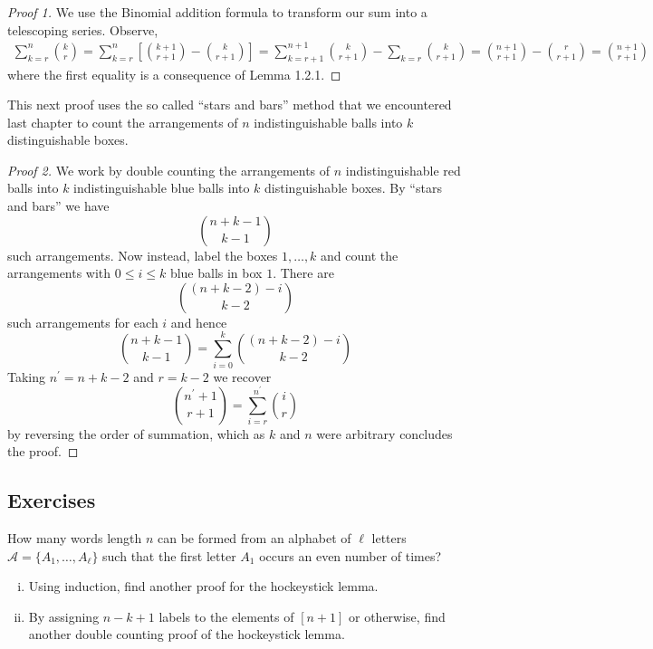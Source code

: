 \documentclass{article}
\begin{document}
\begin{proof}[Proof 1]
    We use the Binomial addition formula to transform our sum into a telescoping series. Observe, 
    \begin{align*}
        \sum_{k = r}^n \binom{k}{r} = \sum_{k=r}^n \left[\binom{k+1}{r+1} - \binom{k}{r+1}\right] 
        = \sum_{k = r+1}^{n+1}\binom{k}{r+1} - \sum_{k = r}\binom{k}{r+1} = \binom{n+1}{r+1} - \binom{r}{r+1} 
        = \binom{n+1}{r+1}
    \end{align*}
    where the first equality is a consequence of Lemma 1.2.1. 
\end{proof}

This next proof uses the so called ``stars and bars'' method that we encountered last chapter to count the 
arrangements of $n$ indistinguishable balls into $k$ distinguishable boxes. 

\begin{proof}[Proof 2]
    We work by double counting the arrangements of $n$ indistinguishable red balls into $k$ 
    indistinguishable blue balls into $k$ distinguishable boxes. By ``stars and bars'' we have 
    \[\binom{n+k-1}{k-1}\]
    such arrangements. Now instead, label the boxes $1, \dots, k$ and count the arrangements with $0 \leq i \leq k$ 
    blue balls in box $1$. There are 
    \[\binom{(n+k-2) - i}{k-2}\]
    such arrangements for each $i$ and hence 
    \[\binom{n+k-1}{k-1} = \sum_{i = 0}^k \binom{(n+k-2) - i}{k-2}\]
    Taking $n^\prime = n + k - 2$ and $r = k-2$ we recover 
    \[\binom{n^\prime+1}{r + 1} = \sum_{i=r}^{n^\prime}\binom{i}{r}\]
    by reversing the order of summation, which as $k$ and $n$ were arbitrary concludes the proof.
\end{proof}

\subsection*{Exercises}

\begin{exercise}[]{}
    How many words length $n$ can be formed from an alphabet of $\ell$ letters $\mathcal{A} = \{A_1, \dots, A_\ell\}$ such that the first letter 
    $A_1$ occurs an even number of times?
\end{exercise}

\begin{exercise}[]{}
    \begin{enumerate}[(i)]
        \item Using induction, find another proof for the hockeystick lemma.
        \item By assigning $n-k+1$ labels to the elements of $[n+1]$ or otherwise, find another double counting 
        proof of the hockeystick lemma.
    \end{enumerate} 
\end{exercise}
\end{document}
